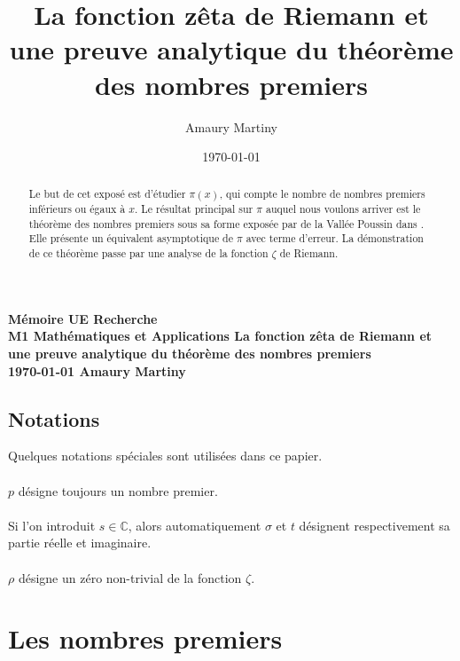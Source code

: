 \documentclass[french]{report}
\title{La fonction zêta de Riemann et une preuve analytique du théorème des nombres premiers}
\author{Amaury Martiny}
\date{\today}
\begin{document}
\begin{titlepage}
  \centering

  \vfill
  {\bfseries
    Mémoire UE Recherche\\
    M1 Mathématiques et Applications
    \vskip1cm
    \Large La fonction zêta de Riemann et une preuve analytique du théorème des nombres premiers\\
    \vskip1cm
    \normalsize \today
    \vskip1cm
    Amaury Martiny
  }    
  \vfill
  \vfill
\end{titlepage}

\begin{abstract}
  Le but de cet exposé est d'étudier $\pi(x)$, qui compte le nombre de nombres premiers inférieurs ou égaux à $x$. Le résultat principal sur $\pi$ auquel nous voulons arriver est le théorème des nombres premiers sous sa forme exposée par de la Vallée Poussin dans \cite{valleepoussin}. Elle présente un équivalent asymptotique de $\pi$ avec terme d'erreur. La démonstration de ce théorème passe par une analyse de la fonction $\zeta$ de Riemann.
\end{abstract}

\tableofcontents{}

\pagebreak
\section*{Notations}
Quelques notations spéciales sont utilisées dans ce papier.
\\\\
$p$ désigne toujours un nombre premier.
\\\\
Si l'on introduit $s\in\mathbb{C}$, alors automatiquement $\sigma$ et $t$ désignent respectivement sa partie réelle et imaginaire.
\\\\
$\rho$ désigne un zéro non-trivial de la fonction $\zeta$.
\chapter{Les nombres premiers}
\end{document}
